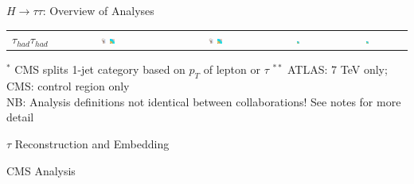 \documentclass{beamer}
\begin{document}
\begin{frame}{$H \rightarrow \tau \tau$: Overview of Analyses}
\begin{table}
\begin{tabular}{c | c | c | c | c | c | c}
			
			\hline
			$\tau_{had} \tau_{had}$ &
			\includegraphics[width=0.05\textwidth]{figures/atlas_logo.pdf} \includegraphics[width=0.05\textwidth]{figures/cms_logo.pdf} &
			\includegraphics[width=0.05\textwidth]{figures/atlas_logo.pdf} \includegraphics[width=0.05\textwidth]{figures/cms_logo.pdf} &	
			\includegraphics[width=0.05\textwidth]{figures/cms_logo.pdf}&
			&\includegraphics[width=0.05\textwidth]{figures/cms_logo.pdf} 
			&  
			\\					
				
		\end{tabular}
	\end{table}
	\scriptsize
	\textcolor{BrickRed}{$^{*}$ CMS splits 1-jet category based on $p_T$ of lepton or $\tau$} \newline
	\textcolor{BrickRed}{$^{**}$ ATLAS: 7 TeV only; CMS: control region only} \\
	NB: Analysis definitions not identical between collaborations!  See notes for more detail
\end{frame}



\begin{frame}{$\tau$ Reconstruction and Embedding}

\end{frame}



\begin{frame}{CMS Analysis}

\end{frame}
\end{document}
